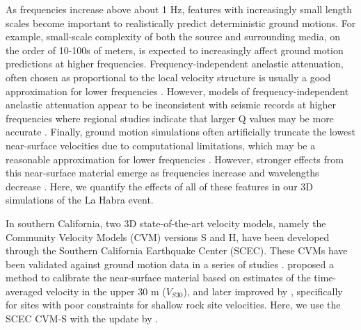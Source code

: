 As frequencies increase above about 1 Hz, features with increasingly small length scales become important to realistically predict deterministic ground motions. For example, small-scale complexity of both the source and surrounding media, on the order of 10-100s of meters, is expected to increasingly affect ground motion predictions at higher frequencies. Frequency-independent anelastic attenuation, often chosen as proportional to the local velocity structure  is usually a good approximation for lower frequencies \citep[up to ~1 Hz; e.g.,  ][]{liu1976velocity,fehler1992separation}. However, models of frequency-independent anelastic attenuation appear to be inconsistent with seismic records at higher frequencies where regional studies indicate that larger Q values may be more accurate . Finally, ground motion simulations often artificially truncate the lowest near-surface velocities due to computational limitations, which may be a reasonable approximation for lower frequencies . However, stronger effects from this near-surface material emerge as frequencies increase and wavelengths decrease . Here, we quantify the effects of all of these features in our 3D simulations of the La Habra event.

In southern California, two 3D state-of-the-art velocity models, namely the Community Velocity Models (CVM) versions S and H, have been developed through the Southern California Earthquake Center (SCEC). These CVMs have been validated against ground motion data in a series of studies .
\citet{elyVs30derivedNearsurfaceSeismic2010} proposed a method to calibrate the near-surface material based on estimates of the time-averaged velocity in the upper 30 m ($V_{S30}$), and later improved by \citet{huCalibrationNearsurfaceSeismic2021}, specifically for sites with poor constraints for shallow rock site velocities. Here, we use the SCEC CVM-S with the update by \citet{huCalibrationNearsurfaceSeismic2021}.

